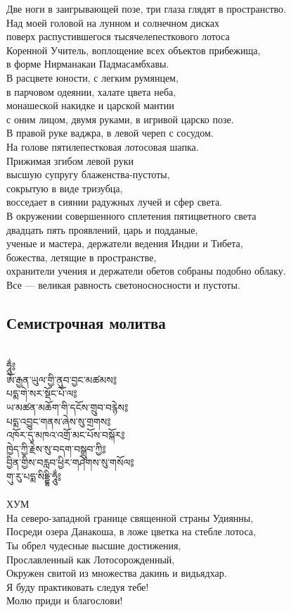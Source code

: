 Две ноги в заигрывающей позе, три глаза глядят в пространство.\\
Над моей головой на лунном и солнечном дисках \\
поверх распустившегося тысячелепесткового лотоса\\
Коренной Учитель, воплощение всех объектов прибежища,\\
в форме Нирманакаи Падмасамбхавы.\\
В расцвете юности, с легким румянцем,\\
в парчовом одеянии, халате цвета неба, \\
монашеской накидке и царской мантии\\
с оним лицом, двумя руками, в игривой царско позе.\\
В правой руке ваджра, в левой череп с сосудом.\\
На голове пятилепестковая лотосовая шапка.\\
Прижимая згибом левой руки \\
высшую супругу блаженства-пустоты,\\
сокрытую в виде тризубца,\\
восседает в сиянии радужных лучей и сфер света.\\
В окружении совершенного сплетения пятицветного света\\
двадцать пять проявлений, царь и подданые,\\
ученые и мастера, держатели ведения Индии и Тибета, \\
божества, летящие в пространстве, \\
охранители учения и держатели обетов собраны подобно облаку.\\
Все — великая равность светоносносности и пустоты.
\newpage
\subsection{Семистрочная молитва}
\\
\ti
ཧཱུྂ༔ \\
ཨོ་རྒྱན་ཡུལ་གྱི་ནུབ་བྱང་མཚམས༔\\
པདྨ་གེ་སར་སྡོང་པོ་ལ༔\\
ཡ་མཚན་མཆོག་གི་དངོས་གྲུབ་བརྙེས༔\\
པདྨ་འབྱུང་གནས་ཞེས་སུ་གྲགས༔\\
འཁོར་དུ་མཁའ་འགྲོ་མང་པོས་བསྐོར༔\\
ཁྱེད་ཀྱི་རྗེས་སུ་བདག་བསྒྲུབ་ཀྱི༔\\
བྱིན་གྱིས་བརླབ་ཕྱིར་གཤེགས་སུ་གསོལ༔\\
གུ་རུ་པདྨ་སིདྡྷི་ཧཱུྂ༔\\
\\
\ru
ХУМ\\
На северо-западной границе священной страны Удиянны,\\
Посреди озера Данакоша, в ложе цветка на стебле лотоса,\\
Ты обрел чудесные высшие достижения,\\
Прославленный как Лотосорожденный,\\
Окружен свитой из множества дакинь и видьядхар.\\
Я буду практиковать следуя тебе!\\
Молю приди и благослови!
\newpage
